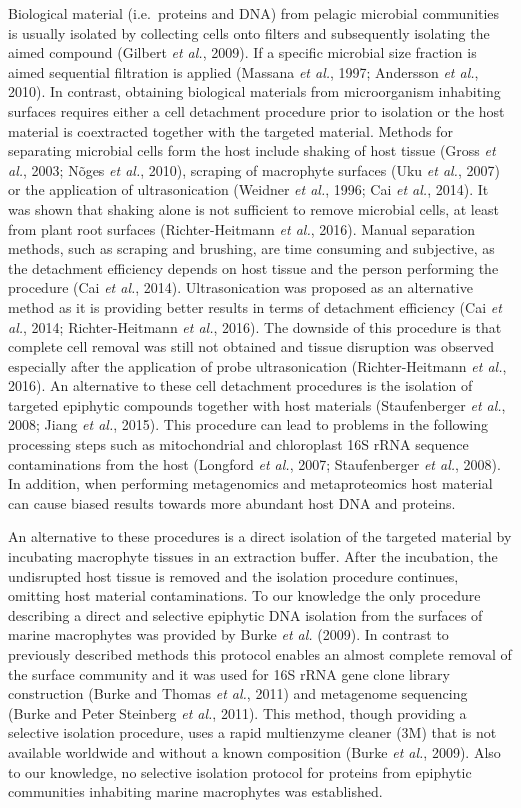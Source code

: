 \documentclass[
  12pt,
]{article}
\begin{document}
Biological material (i.e.~proteins and DNA) from pelagic microbial
communities is usually isolated by collecting cells onto filters and
subsequently isolating the aimed compound (Gilbert \emph{et al.}, 2009).
If a specific microbial size fraction is aimed sequential filtration is
applied (Massana \emph{et al.}, 1997; Andersson \emph{et al.}, 2010). In
contrast, obtaining biological materials from microorganism inhabiting
surfaces requires either a cell detachment procedure prior to isolation
or the host material is coextracted together with the targeted material.
Methods for separating microbial cells form the host include shaking of
host tissue (Gross \emph{et al.}, 2003; Nõges \emph{et al.}, 2010),
scraping of macrophyte surfaces (Uku \emph{et al.}, 2007) or the
application of ultrasonication (Weidner \emph{et al.}, 1996; Cai
\emph{et al.}, 2014). It was shown that shaking alone is not sufficient
to remove microbial cells, at least from plant root surfaces
(Richter-Heitmann \emph{et al.}, 2016). Manual separation methods, such
as scraping and brushing, are time consuming and subjective, as the
detachment efficiency depends on host tissue and the person performing
the procedure (Cai \emph{et al.}, 2014). Ultrasonication was proposed as
an alternative method as it is providing better results in terms of
detachment efficiency (Cai \emph{et al.}, 2014; Richter-Heitmann
\emph{et al.}, 2016). The downside of this procedure is that complete
cell removal was still not obtained and tissue disruption was observed
especially after the application of probe ultrasonication
(Richter-Heitmann \emph{et al.}, 2016). An alternative to these cell
detachment procedures is the isolation of targeted epiphytic compounds
together with host materials (Staufenberger \emph{et al.}, 2008; Jiang
\emph{et al.}, 2015). This procedure can lead to problems in the
following processing steps such as mitochondrial and chloroplast 16S
rRNA sequence contaminations from the host (Longford \emph{et al.},
2007; Staufenberger \emph{et al.}, 2008). In addition, when performing
metagenomics and metaproteomics host material can cause biased results
towards more abundant host DNA and proteins.

An alternative to these procedures is a direct isolation of the targeted
material by incubating macrophyte tissues in an extraction buffer. After
the incubation, the undisrupted host tissue is removed and the isolation
procedure continues, omitting host material contaminations. To our
knowledge the only procedure describing a direct and selective epiphytic
DNA isolation from the surfaces of marine macrophytes was provided by
Burke \emph{et al.} (2009). In contrast to previously described methods
this protocol enables an almost complete removal of the surface
community and it was used for 16S rRNA gene clone library construction
(Burke and Thomas \emph{et al.}, 2011) and metagenome sequencing (Burke
and Peter Steinberg \emph{et al.}, 2011). This method, though providing
a selective isolation procedure, uses a rapid multienzyme cleaner (3M)
that is not available worldwide and without a known composition (Burke
\emph{et al.}, 2009). Also to our knowledge, no selective isolation
protocol for proteins from epiphytic communities inhabiting marine
macrophytes was established.
\end{document}
